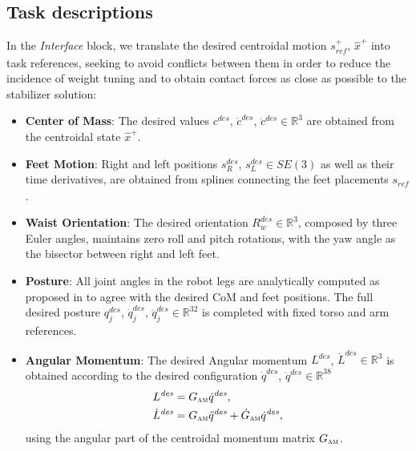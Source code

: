 \documentclass[letterpaper, 10 pt, conference]{ieeeconf}  %
\begin{document}
\subsection{Task descriptions}
In the \textit{Interface} block, we translate the desired centroidal motion $ s_\mathit{ref}^+ $, $ \hat{x}^{+} $ into task references, seeking to avoid conflicts between them in order to reduce the incidence of weight tuning and to obtain contact forces as close as possible to the stabilizer solution:
%
\begin{itemize}
    \item[] \hspace*{-7mm}\textbf{Center of Mass}: The desired values $c^\mathit{des}$, $\dot{c}^\mathit{des}$, $\ddot{c}^\mathit{des}\in \mathbb{R}^3$ are obtained from the centroidal state $\hat{x}^{+}$.
    
    \item[] \hspace*{-7mm}\textbf{Feet Motion}: Right and left positions $s^\mathit{des}_{R}$, $s^\mathit{des}_{L}\in \mathit{SE}(3)$ as well as their time derivatives, are obtained from splines connecting the feet placements $s_\mathit{ref}$ \cite{ndcurves}.
    
    \item[] \hspace*{-7mm}\textbf{Waist Orientation}: The desired orientation $R^\mathit{des}_{w}\in \mathbb{R}^{3}$, composed by three Euler angles, maintains zero roll and pitch rotations, with the yaw angle as the bisector between right and left feet.
    
    \item[] \hspace*{-7mm}\textbf{Posture}: All joint angles in the robot legs are analytically computed as proposed in \cite[Chapter 2.5]{Kajita2014Introduction} to agree with the desired CoM and feet positions. The full desired posture $q_{j}^\mathit{des}$, $\dot{q}_{j}^\mathit{des}$, $\ddot{q}_{j}^\mathit{des}\in \mathbb{R}^{32}$ is completed with fixed torso and arm references.
    
    \item[] \hspace*{-7mm}\textbf{Angular Momentum}: The desired Angular momentum $L^\mathit{des}$, $\dot{L}^\mathit{des}\in \mathbb{R}^{3}$ is obtained according to the desired configuration $\dot{q}^\mathit{des}$, $\ddot{q}^\mathit{des}\in \mathbb{R}^{38}$
    \begin{align}
        L^\mathit{des} &= G_\textsc{am} \dot{q}^\mathit{des},\\
        \dot{L}^\mathit{des} &= G_\textsc{am} \ddot{q}^\mathit{des} +\dot{G}_\textsc{am} \dot{q}^\mathit{des},
    \end{align}
    using the angular part of the centroidal momentum matrix $G_\textsc{am}$.
    

\end{itemize}
\end{document}

